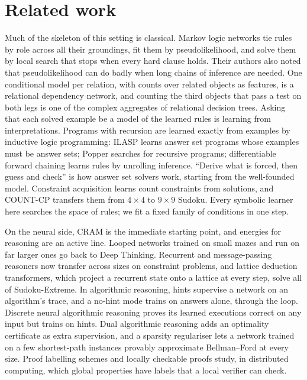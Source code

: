 \documentclass[10pt]{article}
\begin{document}
\section{Related work}\label{sec:related}

Much of the skeleton of this setting is classical. Markov logic networks tie rules by role across all their groundings, fit them by pseudolikelihood, and solve them by
local search that stops when every hard clause holds\cite{richardson2006markov}. Their authors also noted that pseudolikelihood can do badly when long chains of
inference are needed\cite{lowd2007efficient}. One conditional model per relation, with counts over related objects as
features, is a relational dependency network\cite{neville2007relational}, and counting the third objects that pass a test
on both legs is one of the complex aggregates of relational decision trees\cite{vens2006refining}. Asking that each
solved example be a model of the learned rules is learning from interpretations\cite{deraedt1994first}. Programs with
recursion are learned exactly from examples by inductive logic programming: ILASP learns answer set programs whose
examples must be answer sets\cite{law2014inductive}; Popper searches for recursive programs\cite{cropper2021learning};
differentiable forward chaining learns rules by unrolling inference\cite{evans2018learning}. ``Derive what is forced,
then guess and check'' is how answer set solvers work, starting from the well-founded model\cite{vangelder1991well}.
Constraint acquisition learns count constraints from solutions, and COUNT-CP transfers them from $4\times4$ to $9\times9$
Sudoku\cite{kumar2022learning}. Every symbolic learner here searches the space of rules; we fit a fixed family of
conditions in one step.

On the neural side, CRAM is the immediate starting point\cite{hoover2026classical}, and energies for reasoning are an
active line\cite{du2022learning,chen2026energy}. Looped networks trained on small mazes and run on far larger ones go
back to Deep Thinking\cite{bansal2022end}. Recurrent and message-passing reasoners now transfer across sizes on
constraint problems\cite{toenshoff2023one,salvatori2026tiny}, and lattice deduction transformers, which project a
recurrent state onto a lattice at every step, solve all of Sudoku-Extreme\cite{davis2026lattice}. In algorithmic reasoning, hints supervise a network
on an algorithm's trace\cite{velickovic2022clrs}, and a no-hint mode trains on answers alone, through the
loop\cite{rodionov2023neural}. Discrete neural algorithmic reasoning proves its learned executions correct on any input
but trains on hints\cite{rodionov2025discrete}. Dual algorithmic reasoning adds an optimality certificate as extra
supervision\cite{numeroso2023dual}, and a sparsity regulariser lets a network trained on a few shortest-path instances
provably approximate Bellman--Ford at every size\cite{nerem2025graph}. Proof labelling schemes and locally checkable
proofs study, in distributed computing, which global properties have labels that a local verifier can
check\cite{korman2010proof,korman2007distributed,goos2016locally}.
\end{document}

